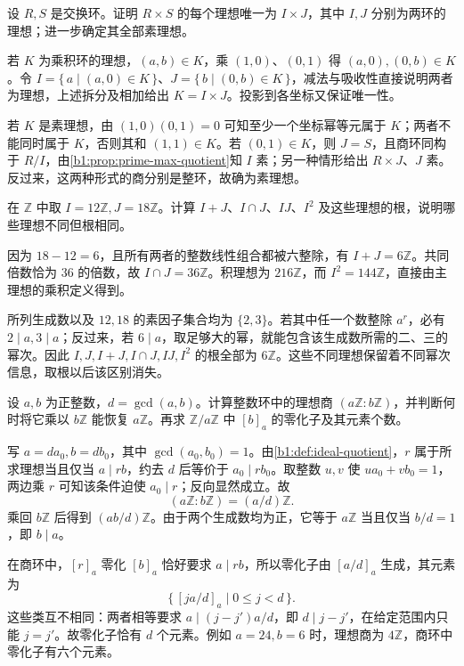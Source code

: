 \begin{exercise}\label{b1:ex:10-product-ideals}
	设 \(R,S\) 是交换环。证明 \(R\times S\) 的每个理想唯一为 \(I\times J\)，其中 \(I,J\) 分别为两环的理想；进一步确定其全部素理想。
\end{exercise}
\begin{solution}
	若 \(K\) 为乘积环的理想，\((a,b)\in K\)，乘 \((1,0)\)、\((0,1)\) 得 \((a,0),(0,b)\in K\)。令 \(I=\bigl\{\,a\mid(a,0)\in K\,\bigr\}\)、\(J=\bigl\{\,b\mid(0,b)\in K\,\bigr\}\)，减法与吸收性直接说明两者为理想，上述拆分及相加给出 \(K=I\times J\)。投影到各坐标又保证唯一性。

	若 \(K\) 是素理想，由 \((1,0)(0,1)=0\) 可知至少一个坐标幂等元属于 \(K\)；两者不能同时属于 \(K\)，否则其和 \((1,1)\in K\)。若 \((0,1)\in K\)，则 \(J=S\)，且商环同构于 \(R/I\)，由\cref{b1:prop:prime-max-quotient}知 \(I\) 素；另一种情形给出 \(R\times J\)、\(J\) 素。反过来，这两种形式的商分别是整环，故确为素理想。
\end{solution}

\begin{exercise}\label{b1:ex:10-integer-ideal-operations}
	在 \(\mathbb Z\) 中取 \(I=12\mathbb Z,J=18\mathbb Z\)。计算 \(I+J\)、\(I\cap J\)、\(IJ\)、\(I^2\) 及这些理想的根，说明哪些理想不同但根相同。
\end{exercise}
\begin{solution}
	因为 \(18-12=6\)，且所有两者的整数线性组合都被六整除，有 \(I+J=6\mathbb Z\)。共同倍数恰为 \(36\) 的倍数，故 \(I\cap J=36\mathbb Z\)。积理想为 \(216\mathbb Z\)，而 \(I^2=144\mathbb Z\)，直接由主理想的乘积定义得到。

	所列生成数以及 \(12,18\) 的素因子集合均为 \(\{2,3\}\)。若其中任一个数整除 \(a^r\)，必有 \(2\mid a,3\mid a\)；反过来，若 \(6\mid a\)，取足够大的幂，就能包含该生成数所需的二、三的幂次。因此 \(I,J,I+J,I\cap J,IJ,I^2\) 的根全部为 \(6\mathbb Z\)。这些不同理想保留着不同幂次信息，取根以后该区别消失。
\end{solution}

\begin{exercise}\label{b1:ex:10-integer-colon}
	设 \(a,b\) 为正整数，\(d=\gcd(a,b)\)。计算整数环中的理想商 \((a\mathbb Z:b\mathbb Z)\)，并判断何时将它乘以 \(b\mathbb Z\) 能恢复 \(a\mathbb Z\)。再求 \(\mathbb Z/a\mathbb Z\) 中 \([b]_a\) 的零化子及其元素个数。
\end{exercise}
\begin{solution}
	写 \(a=da_0,b=db_0\)，其中 \(\gcd(a_0,b_0)=1\)。由\cref{b1:def:ideal-quotient}，\(r\) 属于所求理想当且仅当 \(a\mid rb\)，约去 \(d\) 后等价于 \(a_0\mid rb_0\)。取整数 \(u,v\) 使 \(ua_0+vb_0=1\)，两边乘 \(r\) 可知该条件迫使 \(a_0\mid r\)；反向显然成立。故
	\[
		(a\mathbb Z:b\mathbb Z)=(a/d)\mathbb Z.
	\]
	乘回 \(b\mathbb Z\) 后得到 \((ab/d)\mathbb Z\)。由于两个生成数均为正，它等于 \(a\mathbb Z\) 当且仅当 \(b/d=1\)，即 \(b\mid a\)。

	在商环中，\([r]_a\) 零化 \([b]_a\) 恰好要求 \(a\mid rb\)，所以零化子由 \([a/d]_a\) 生成，其元素为
	\[
		\bigl\{\,[j a/d]_a\mid0\leq j<d\,\bigr\}.
	\]
	这些类互不相同：两者相等要求 \(a\mid(j-j')a/d\)，即 \(d\mid j-j'\)，在给定范围内只能 \(j=j'\)。故零化子恰有 \(d\) 个元素。例如 \(a=24,b=6\) 时，理想商为 \(4\mathbb Z\)，商环中零化子有六个元素。
\end{solution}

